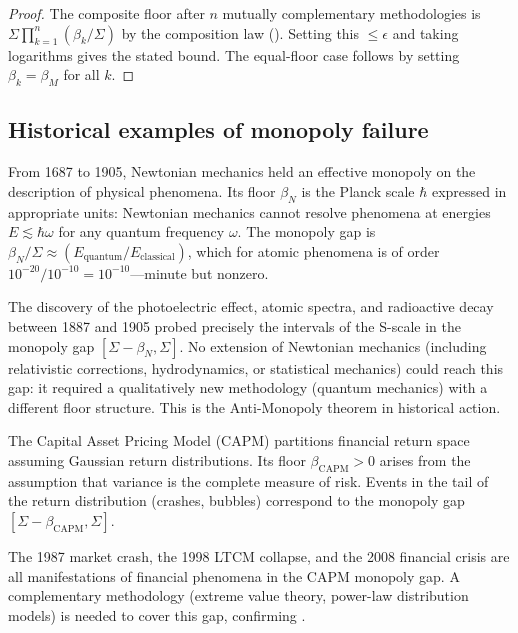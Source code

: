 \begin{proof}
The composite floor after $n$ mutually complementary methodologies is
$\Sigma\prod_{k=1}^n(\beta_k/\Sigma)$ by the composition law
().  Setting this $\leq \epsilon$ and taking logarithms
gives the stated bound.  The equal-floor case follows by setting
$\beta_k = \beta_M$ for all $k$.
\end{proof}

\subsection{Historical examples of monopoly failure}

\begin{example}
\label{ex:ch02-newtonian-monopoly}
From 1687 to 1905, Newtonian mechanics held an effective monopoly on the
description of physical phenomena.  Its floor $\beta_N$ is the Planck scale
$\hbar$ expressed in appropriate units: Newtonian mechanics cannot resolve
phenomena at energies $E \lesssim \hbar\omega$ for any quantum frequency
$\omega$.  The monopoly gap is $\beta_N/\Sigma \approx (E_\mathrm{quantum}/
E_\mathrm{classical})$, which for atomic phenomena is of order $10^{-20}/
10^{-10} = 10^{-10}$---minute but nonzero.

The discovery of the photoelectric effect, atomic spectra, and radioactive decay
between 1887 and 1905 probed precisely the intervals of the S-scale in the
monopoly gap $[\Sigma - \beta_N, \Sigma]$.  No extension of Newtonian mechanics
(including relativistic corrections, hydrodynamics, or statistical mechanics)
could reach this gap: it required a qualitatively new methodology (quantum
mechanics) with a different floor structure.  This is the Anti-Monopoly theorem
in historical action.
\end{example}

\begin{example}
\label{ex:ch02-capm-monopoly}
The Capital Asset Pricing Model (CAPM) partitions financial return space
assuming Gaussian return distributions.  Its floor $\beta_{\mathrm{CAPM}}
> 0$ arises from the assumption that variance is the complete measure of
risk.  Events in the tail of the return distribution (crashes, bubbles)
correspond to the monopoly gap $[\Sigma - \beta_{\mathrm{CAPM}}, \Sigma]$.

The 1987 market crash, the 1998 LTCM collapse, and the 2008 financial crisis
are all manifestations of financial phenomena in the CAPM monopoly gap.  A
complementary methodology (extreme value theory, power-law distribution
models) is needed to cover this gap, confirming .
\end{example}


